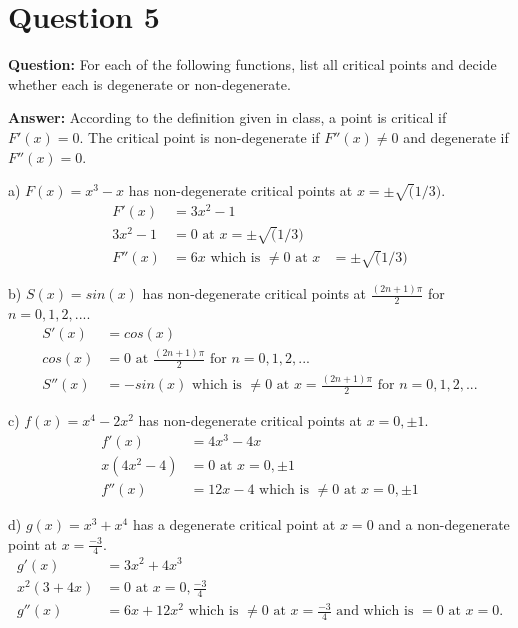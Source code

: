 \documentclass[12pt]{article}
\newenvironment{myenv}{\begin{adjustwidth}{1cm}{}}{\end{adjustwidth}}
\begin{document}
\section*{Question 5}
\begin{myenv}
\textbf{Question:} For each of the following functions, list all critical points and decide whether each is degenerate or non-degenerate.

\textbf{Answer:} According to the definition given in class, a point is critical if $F'(x) = 0$. The critical point is non-degenerate if $F''(x)\neq0$ and degenerate if $F''(x) = 0$.

a) $F(x) = x^3 - x$ has non-degenerate critical points at $x = \pm\sqrt(1/3)$.
	\begin{alignat*}{3}
	F'(x) &= 3x^2 - 1 \\
	3x^2 - 1 &= 0 \text{ at } x = \pm\sqrt(1/3) \\
	F''(x) &= 6x \text{ which is $\neq0$ at } x &= \pm\sqrt(1/3)
	\end{alignat*}
	
b) $S(x) = sin(x)$ has non-degenerate critical points at $ \frac{(2n+1)\pi}{2}$ for $n = 0,1,2,...$.
	\begin{alignat*}{3}
	S'(x) &= cos(x) \\
	cos(x) &= 0 \text{ at } \frac{(2n+1)\pi}{2} \text{ for } n = 0,1,2,...\\
	S''(x) &= -sin(x) \text{ which is $\neq0$ at } x = \frac{(2n+1)\pi}{2} \text{ for } n = 0,1,2,...
	\end{alignat*}
	
c) $f(x) = x^4-2x^2$ has non-degenerate critical points at $x = 0, \pm1$.
	\begin{alignat*}{3}
	f'(x) &= 4x^3 - 4x \\
	x(4x^2-4) &= 0 \text{ at } x = 0, \pm1\\
	f''(x) &= 12x-4 \text{ which is $\neq0$ at } x = 0, \pm1
	\end{alignat*}

d) $g(x) = x^3 + x^4$ has a degenerate critical point at $x = 0$ and a non-degenerate point at $x = \frac{-3}{4}$.
	\begin{alignat*}{3}
	g'(x) &= 3x^2 + 4x^3 \\
	x^2(3+4x) &= 0 \text{ at } x = 0, \frac{-3}{4}\\
	g''(x) &= 6x + 12x^2 \text{ which is $\neq0$ at } x = \frac{-3}{4} \text{ and which is $=0$ at } x = 0.
	\end{alignat*}

\end{myenv}
\end{document}
